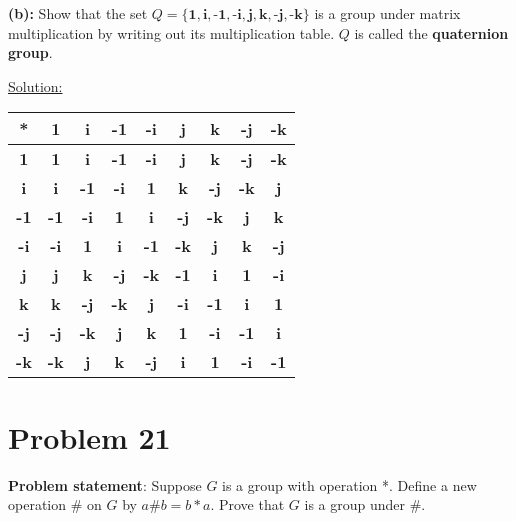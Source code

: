 \documentclass{article} %
\begin{document}
\textbf{(b):} Show that the set $Q = \{\textbf{1}, \textbf{i}, \textbf{-1}, \textbf{-i}, \textbf{j}, \textbf{k}, \textbf{-j}, \textbf{-k}\}$ is a group under matrix multiplication by writing out its multiplication table.  $Q$ is called the \textbf{quaternion group}.
\begin{addmargin}[1em]{0em}
\underline{Solution: }
\begin{addmargin}[1em]{0em}
\begin{tabular}{c | c c c c c c c c}
*                & \textbf{1} & \textbf{i} & \textbf{-1} & \textbf{-i} & \textbf{j} & \textbf{k} & \textbf{-j} & \textbf{-k} \\ \hline
\textbf{1} & \textbf{1} & \textbf{i} & \textbf{-1} & \textbf{-i} & \textbf{j} & \textbf{k} & \textbf{-j} & \textbf{-k} \\
\textbf{i} & \textbf{i} & \textbf{-1} & \textbf{-i} & \textbf{1} & \textbf{k} & \textbf{-j} & \textbf{-k} & \textbf{j} \\
\textbf{-1} & \textbf{-1} & \textbf{-i} & \textbf{1} & \textbf{i} & \textbf{-j} & \textbf{-k} & \textbf{j} & \textbf{k} \\
\textbf{-i} & \textbf{-i} & \textbf{1} & \textbf{i} & \textbf{-1} & \textbf{-k} & \textbf{j} & \textbf{k} & \textbf{-j} \\
\textbf{j} & \textbf{j} & \textbf{k} & \textbf{-j} & \textbf{-k} & \textbf{-1} & \textbf{i} & \textbf{1} & \textbf{-i} \\
\textbf{k} & \textbf{k} & \textbf{-j} & \textbf{-k} & \textbf{j} & \textbf{-i} & \textbf{-1} & \textbf{i} & \textbf{1} \\
\textbf{-j} & \textbf{-j} & \textbf{-k} & \textbf{j} & \textbf{k} & \textbf{1} & \textbf{-i} & \textbf{-1} & \textbf{i} \\
\textbf{-k} & \textbf{-k} & \textbf{j} & \textbf{k} & \textbf{-j} & \textbf{i} & \textbf{1} & \textbf{-i} & \textbf{-1}

\end{tabular}
\end{addmargin}
\end{addmargin}


\newpage

\section*{Problem 21}


\textbf{Problem statement}: Suppose $G$ is a group with operation *.  Define a new operation $\#$ on $G$ by $a \# b = b * a$.  Prove that $G$ is a group under $\#$.
\\
\end{document}
